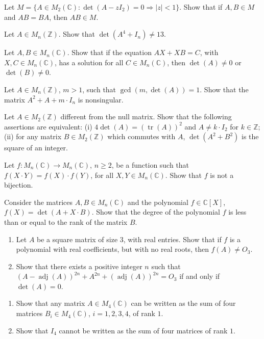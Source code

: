 \documentclass[12pt]{article}
\begin{document}
\begin{problems}
\item Let $M = \{A\in M_2(\mathbb{C}) : \det(A-zI_2)=0 \Rightarrow |z|<1\}$. Show that if $A,B\in M$ and $AB=BA$, then $AB\in M$.

\item Let $A\in M_n(\mathbb{Z})$. Show that $\det(A^4+I_n) \ne 13$.

\item Let $A,B\in M_n(\mathbb{C})$. Show that if the equation $AX+XB=C$, with $X,C\in M_n(\mathbb{C})$, has a solution for all $C\in M_n(\mathbb{C})$, then $\det(A)\ne 0$ or $\det(B)\ne 0$.

\item Let $A\in M_n(\mathbb{Z})$, $m>1$, such that $\gcd(m,\det(A))=1$. Show that the matrix $A^2+A+m\cdot I_n$ is nonsingular.

\item Let $A\in M_2(\mathbb{Z})$ different from the null matrix. Show that the following assertions are equivalent: (i) $4\det(A)=(\operatorname{tr}(A))^2$ and $A\ne k\cdot I_2$ for $k\in\mathbb{Z}$; (ii) for any matrix $B\in M_2(\mathbb{Z})$ which commutes with $A$, $\det(A^2+B^2)$ is the square of an integer.

\item Let $f:M_n(\mathbb{C})\to M_n(\mathbb{C})$, $n\ge 2$, be a function such that $f(X\cdot Y) = f(X)\cdot f(Y)$, for all $X,Y\in M_n(\mathbb{C})$. Show that $f$ is not a bijection.

\item Consider the matrices $A,B\in M_n(\mathbb{C})$ and the polynomial $f\in\mathbb{C}[X]$, $f(X)=\det(A+X\cdot B)$. Show that the degree of the polynomial $f$ is less than or equal to the rank of the matrix $B$.

\item
\begin{enumerate}[label=(\alph*)]
\item Let $A$ be a square matrix of size $3$, with real entries. Show that if $f$ is a polynomial with real coefficients, but with no real roots, then $f(A)\ne O_3$.
\item Show that there exists a positive integer $n$ such that $(A-\operatorname{adj}(A))^{2n} + A^{2n} + (\operatorname{adj}(A))^{2n} = O_3$ if and only if $\det(A)=0$.
\end{enumerate}

\item
\begin{enumerate}[label=(\alph*)]
\item Show that any matrix $A\in M_4(\mathbb{C})$ can be written as the sum of four matrices $B_i\in M_4(\mathbb{C})$, $i=1,2,3,4$, of rank $1$.
\item Show that $I_4$ cannot be written as the sum of four matrices of rank $1$.
\end{enumerate}


\end{problems}
\end{document}

